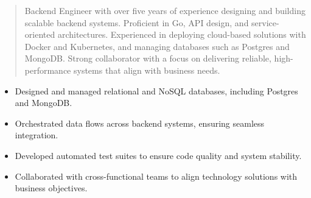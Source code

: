 



\makecvheader

\begin{quote}
  \noindent
  Backend Engineer with over five years of experience designing and building scalable backend systems. Proficient in Go, API design, and service-oriented architectures. Experienced in deploying cloud-based solutions with Docker and Kubernetes, and managing databases such as Postgres and MongoDB. Strong collaborator with a focus on delivering reliable, high-performance systems that align with business needs.
\end{quote}

\par\smallskip
\noindent
\begin{minipage}{20cm}
  \begin{minipage}{9.75cm}
    \begin{itemize}
      \item Designed and managed relational and NoSQL databases, including Postgres and MongoDB.
      \item Orchestrated data flows across backend systems, ensuring seamless integration.
    \end{itemize}
  \end{minipage}
  \hfill
  \begin{minipage}{9.75cm}
    \begin{itemize}
      \item Developed automated test suites to ensure code quality and system stability.
      \item Collaborated with cross-functional teams to align technology solutions with business objectives.
    \end{itemize}
  \end{minipage}
\end{minipage}
\par\smallskip
\divider

